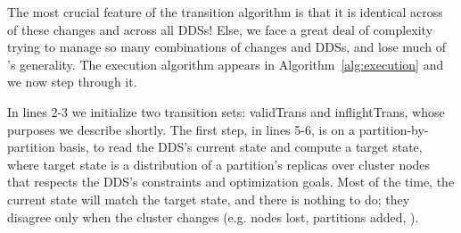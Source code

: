 

The most crucial feature of the \helix transition algorithm is that it is identical 
across of these changes and across all DDSs!  Else, we face a great deal of
complexity trying to manage so many combinations of changes and DDSs, and lose
much of \helix's generality.   
The execution algorithm appears in Algorithm~\ref{alg:execution} and we now step
through it.


In lines 2-3 we initialize two transition sets: validTrans and
inflightTrans, whose purposes we describe shortly.  
The first step, in lines 5-6, is on a partition-by-partition basis, to 
read the DDS's current state and compute a target state, where
target state is a distribution of a partition's replicas over cluster nodes 
that respects the DDS's constraints and optimization goals.  Most of the time, 
the current state will match the target state, and there is nothing to do; they
disagree only when the cluster changes (e.g. nodes lost, partitions added,
\etc).

